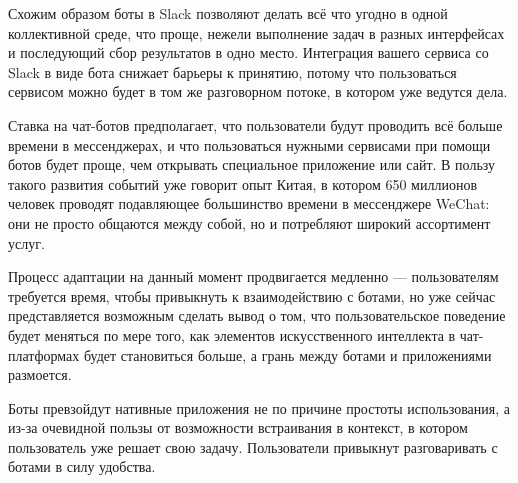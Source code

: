 Схожим образом боты в Slack позволяют делать всё что угодно в одной коллективной среде, что проще, нежели выполнение задач в разных интерфейсах и последующий сбор результатов в одно место. Интеграция вашего сервиса со Slack в виде бота снижает барьеры к принятию, потому что пользоваться сервисом можно будет в том же разговорном потоке, в котором уже ведутся дела.

Ставка на чат-ботов предполагает, что пользователи будут проводить всё больше времени в мессенджерах, и что пользоваться нужными сервисами при помощи ботов будет проще, чем открывать специальное приложение или сайт. В пользу такого развития событий уже говорит опыт Китая, в котором 650 миллионов человек проводят подавляющее большинство времени в мессенджере WeChat: они не просто общаются между собой, но и потребляют широкий ассортимент услуг.

Процесс адаптации на данный момент продвигается медленно — пользователям требуется время, чтобы привыкнуть к взаимодействию с ботами, но уже сейчас представляется возможным сделать вывод о том, что пользовательское поведение будет меняться по мере того, как элементов искусственного интеллекта в чат-платформах будет становиться больше, а грань между ботами и приложениями размоется.

Боты превзойдут нативные приложения не по причине простоты использования, а из-за очевидной пользы от возможности встраивания в контекст, в котором пользователь уже решает свою задачу. Пользователи привыкнут разговаривать с ботами в силу удобства.